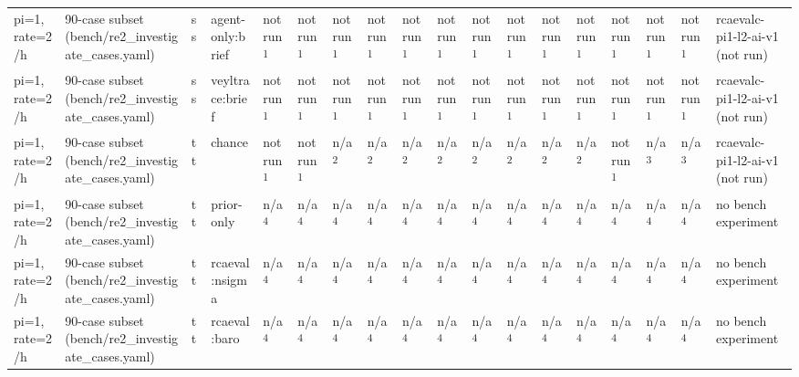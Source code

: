\begin{table}[t]
\begin{tabular}{llllllllllllllllll}
pi=1, rate=2/h & 90-case subset (bench/re2\_investigate\_cases.yaml) & ss & agent-only:brief & not run\textsuperscript{1} & not run\textsuperscript{1} & not run\textsuperscript{1} & not run\textsuperscript{1} & not run\textsuperscript{1} & not run\textsuperscript{1} & not run\textsuperscript{1} & not run\textsuperscript{1} & not run\textsuperscript{1} & not run\textsuperscript{1} & not run\textsuperscript{1} & not run\textsuperscript{1} & not run\textsuperscript{1} & rcaevalc-pi1-l2-ai-v1 (not run) \\
pi=1, rate=2/h & 90-case subset (bench/re2\_investigate\_cases.yaml) & ss & veyltrace:brief & not run\textsuperscript{1} & not run\textsuperscript{1} & not run\textsuperscript{1} & not run\textsuperscript{1} & not run\textsuperscript{1} & not run\textsuperscript{1} & not run\textsuperscript{1} & not run\textsuperscript{1} & not run\textsuperscript{1} & not run\textsuperscript{1} & not run\textsuperscript{1} & not run\textsuperscript{1} & not run\textsuperscript{1} & rcaevalc-pi1-l2-ai-v1 (not run) \\
pi=1, rate=2/h & 90-case subset (bench/re2\_investigate\_cases.yaml) & tt & chance & not run\textsuperscript{1} & not run\textsuperscript{1} & n/a\textsuperscript{2} & n/a\textsuperscript{2} & n/a\textsuperscript{2} & n/a\textsuperscript{2} & n/a\textsuperscript{2} & n/a\textsuperscript{2} & n/a\textsuperscript{2} & n/a\textsuperscript{2} & not run\textsuperscript{1} & n/a\textsuperscript{3} & n/a\textsuperscript{3} & rcaevalc-pi1-l2-ai-v1 (not run) \\
pi=1, rate=2/h & 90-case subset (bench/re2\_investigate\_cases.yaml) & tt & prior-only & n/a\textsuperscript{4} & n/a\textsuperscript{4} & n/a\textsuperscript{4} & n/a\textsuperscript{4} & n/a\textsuperscript{4} & n/a\textsuperscript{4} & n/a\textsuperscript{4} & n/a\textsuperscript{4} & n/a\textsuperscript{4} & n/a\textsuperscript{4} & n/a\textsuperscript{4} & n/a\textsuperscript{4} & n/a\textsuperscript{4} & no bench experiment \\
pi=1, rate=2/h & 90-case subset (bench/re2\_investigate\_cases.yaml) & tt & rcaeval:nsigma & n/a\textsuperscript{4} & n/a\textsuperscript{4} & n/a\textsuperscript{4} & n/a\textsuperscript{4} & n/a\textsuperscript{4} & n/a\textsuperscript{4} & n/a\textsuperscript{4} & n/a\textsuperscript{4} & n/a\textsuperscript{4} & n/a\textsuperscript{4} & n/a\textsuperscript{4} & n/a\textsuperscript{4} & n/a\textsuperscript{4} & no bench experiment \\
pi=1, rate=2/h & 90-case subset (bench/re2\_investigate\_cases.yaml) & tt & rcaeval:baro & n/a\textsuperscript{4} & n/a\textsuperscript{4} & n/a\textsuperscript{4} & n/a\textsuperscript{4} & n/a\textsuperscript{4} & n/a\textsuperscript{4} & n/a\textsuperscript{4} & n/a\textsuperscript{4} & n/a\textsuperscript{4} & n/a\textsuperscript{4} & n/a\textsuperscript{4} & n/a\textsuperscript{4} & n/a\textsuperscript{4} & no bench experiment \\

\end{tabular}
\end{table}
